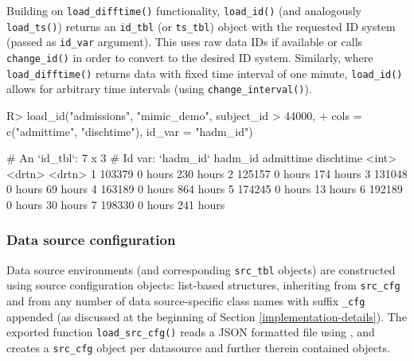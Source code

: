 \documentclass[
  notitle]{jss}
\begin{document}
Building on \texttt{load\_difftime()} functionality, \texttt{load\_id()}
(and analogously \texttt{load\_ts()}) returns an \texttt{id\_tbl} (or
\texttt{ts\_tbl}) object with the requested ID system (passed as
\texttt{id\_var} argument). This uses raw data IDs if available or calls
\texttt{change\_id()} in order to convert to the desired ID system.
Similarly, where \texttt{load\_difftime()} returns data with fixed time
interval of one minute, \texttt{load\_id()} allows for arbitrary time
intervals (using \texttt{change\_interval()}).

\begin{CodeChunk}
\begin{CodeInput}
R> load_id("admissions", "mimic_demo", subject_id > 44000,
+         cols = c("admittime", "dischtime"), id_var = "hadm_id")
\end{CodeInput}
\end{CodeChunk}

\begin{CodeChunk}
\begin{CodeOutput}
# An `id_tbl`: 7 x 3
# Id var:      `hadm_id`
  hadm_id admittime dischtime
    <int> <drtn>    <drtn>
1  103379 0 hours   230 hours
2  125157 0 hours   174 hours
3  131048 0 hours    69 hours
4  163189 0 hours   864 hours
5  174245 0 hours    13 hours
6  192189 0 hours    30 hours
7  198330 0 hours   241 hours
\end{CodeOutput}
\end{CodeChunk}

\hypertarget{data-source-configuration}{%
\subsubsection{Data source
configuration}\label{data-source-configuration}}

Data source environments (and corresponding \texttt{src\_tbl} objects)
are constructed using source configuration objects: list-based
structures, inheriting from \texttt{src\_cfg} and from any number of
data source-specific class names with suffix \texttt{\_cfg} appended (as
discussed at the beginning of Section \ref{implementation-details}). The
exported function \texttt{load\_src\_cfg()} reads a JSON formatted file
using  \citep{ooms2014}, and creates a \texttt{src\_cfg}
object per datasource and further therein contained objects.
\end{document}
